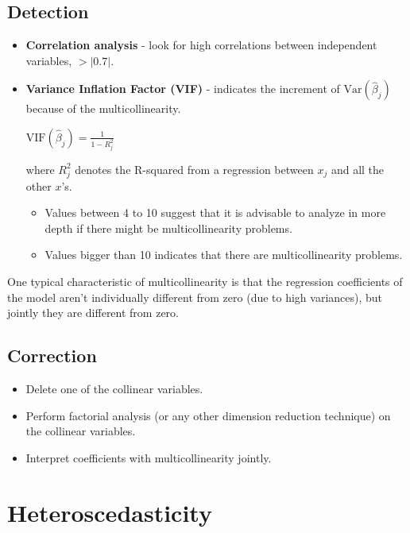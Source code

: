 \documentclass[10pt, a4paper, landscape]{extarticle}
\newcommand{\Var}{\mathrm{Var}}
\begin{document}
\begin{multicols}{3}
\subsection*{Detection}

\begin{itemize}[leftmargin=*]
	\item \textbf{Correlation analysis} - look for high correlations between independent variables, $> \lvert 0.7 \rvert$.
	\item \textbf{Variance Inflation Factor (VIF)} - indicates the increment of $\Var(\hat{\beta}_j)$ because of the multicollinearity.
	\begin{center}
		$\mathrm{VIF} (\hat{\beta}_j) = \frac{1}{1 - R_j^2}$
	\end{center}
	where $R^2_j$ denotes the R-squared from a regression between $x_j$ and all the other $x$'s. 
	\begin{itemize}[leftmargin=*]
		\item Values between 4 to 10 suggest that it is advisable to analyze in more depth if there might be multicollinearity problems.
		\item Values bigger than 10 indicates that there are multicollinearity problems.
	\end{itemize}
\end{itemize}

One typical characteristic of multicollinearity is that the regression coefficients of the model aren't individually different from zero (due to high variances), but jointly they are different from zero.

\subsection*{Correction}

\begin{itemize}[leftmargin=*]
	\item Delete one of the collinear variables.
	\item Perform factorial analysis (or any other dimension reduction technique) on the collinear variables.
	\item Interpret coefficients with multicollinearity jointly.
\end{itemize}

\columnbreak

\section*{Heteroscedasticity}


\end{multicols}
\end{document}
